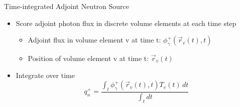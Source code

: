 \documentclass{beamer}
\begin{document}
\begin{frame}{Time-integrated Adjoint Neutron Source}
	\begin{itemize}
		\item{Score adjoint photon flux in discrete volume elements at
			each time step}
	   \begin{itemize}
	   \item	{Adjoint flux in volume element v at time t: 
		   $\phi_{\gamma}^{+}(\overrightarrow{r}_{v}(t), t)$ }
	   \item  {Position of volume element v at time t:
	   	$\overrightarrow{r}_{v}(t)$ }
	   \end{itemize}
   \item{ Integrate over time}
        \begin{equation}\label{eq:adj_src_1_avg}
		q_{n}^{+} = \frac
		{\int_{t}  \phi_{\gamma}^{+}(\overrightarrow{r}_{v}(t), t)
		 T_v(t)\, dt}
		 {\int_t dt}
        \end{equation}
	\end{itemize}




\end{frame}
\end{document}
